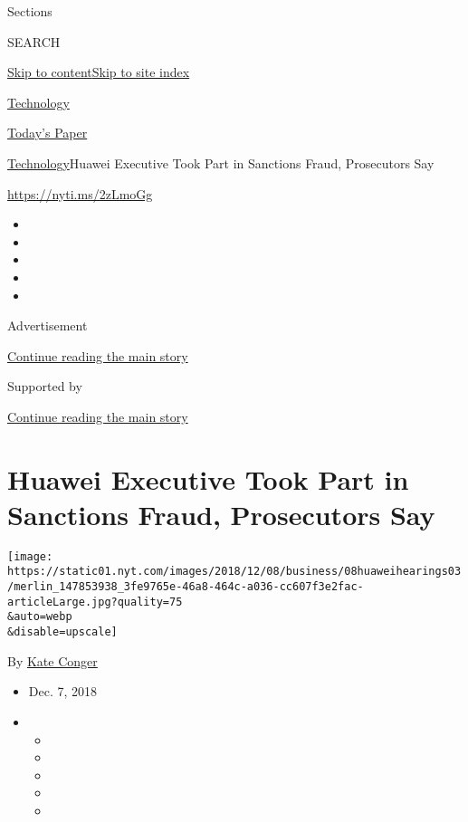 Sections

SEARCH

\protect\hyperlink{site-content}{Skip to
content}\protect\hyperlink{site-index}{Skip to site index}

\href{https://www.nytimes.com/section/technology}{Technology}

\href{https://myaccount.nytimes.com/auth/login?response_type=cookie\&client_id=vi}{}

\href{https://www.nytimes.com/section/todayspaper}{Today's Paper}

\href{/section/technology}{Technology}\textbar{}Huawei Executive Took
Part in Sanctions Fraud, Prosecutors Say

\url{https://nyti.ms/2zLmoGg}

\begin{itemize}
\item
\item
\item
\item
\item
\end{itemize}

Advertisement

\protect\hyperlink{after-top}{Continue reading the main story}

Supported by

\protect\hyperlink{after-sponsor}{Continue reading the main story}

\hypertarget{huawei-executive-took-part-in-sanctions-fraud-prosecutors-say}{%
\section{Huawei Executive Took Part in Sanctions Fraud, Prosecutors
Say}\label{huawei-executive-took-part-in-sanctions-fraud-prosecutors-say}}

\texttt{[image: https://static01.nyt.com/images/2018/12/08/business/08huaweihearings03/merlin\_147853938\_3fe9765e-46a8-464c-a036-cc607f3e2fac-articleLarge.jpg?quality=75\\\&auto=webp\\\&disable=upscale]}

By \href{https://www.nytimes.com/by/kate-conger}{Kate Conger}

\begin{itemize}
\item
  Dec. 7, 2018
\item
  \begin{itemize}
  \item
  \item
  \item
  \item
  \item
  \end{itemize}
\end{itemize}

